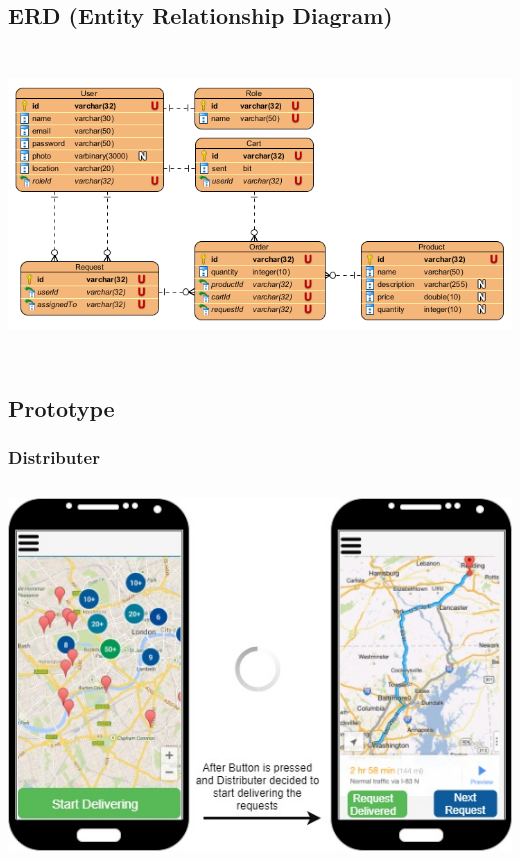 \documentclass[12pt]{article}
\begin{document}
\subsection{ ERD (Entity Relationship Diagram) }

\includegraphics[width=16.5cm,height=8.25cm]{./assets/erd.png}


\subsection{ Prototype }

\subsubsection{ Distributer }
\includegraphics[width=16cm,height=10cm]{./assets/prototype/distributer-1.png}\\
\end{document}
